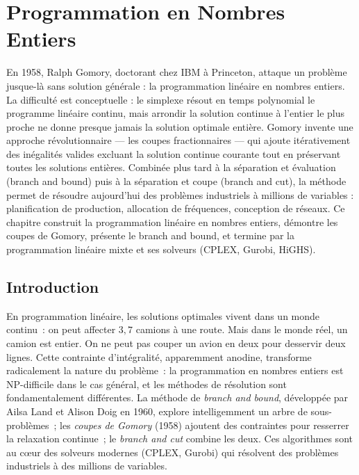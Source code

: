 \chapter{Programmation en Nombres Entiers}
\label{ch:nombres_entiers}

En 1958, Ralph Gomory, doctorant chez IBM à Princeton, attaque un problème jusque-là sans solution générale : la programmation linéaire en nombres entiers. La difficulté est conceptuelle : le simplexe résout en temps polynomial le programme linéaire continu, mais arrondir la solution continue à l'entier le plus proche ne donne presque jamais la solution optimale entière. Gomory invente une approche révolutionnaire --- les coupes fractionnaires --- qui ajoute itérativement des inégalités valides excluant la solution continue courante tout en préservant toutes les solutions entières. Combinée plus tard à la séparation et évaluation (branch and bound) puis à la séparation et coupe (branch and cut), la méthode permet de résoudre aujourd'hui des problèmes industriels à millions de variables : planification de production, allocation de fréquences, conception de réseaux. Ce chapitre construit la programmation linéaire en nombres entiers, démontre les coupes de Gomory, présente le branch and bound, et termine par la programmation linéaire mixte et ses solveurs (CPLEX, Gurobi, HiGHS).

\section{Introduction}

En programmation lin\'eaire, les solutions optimales vivent dans un monde continu~: on peut affecter $3{,}7$ camions \`a une route. Mais dans le monde r\'eel, un camion est entier. On ne peut pas couper un avion en deux pour desservir deux lignes. Cette contrainte d'int\'egralit\'e, apparemment anodine, transforme radicalement la nature du probl\`eme~: la programmation en nombres entiers est NP-difficile dans le cas g\'en\'eral, et les m\'ethodes de r\'esolution sont fondamentalement diff\'erentes. La m\'ethode de \emph{branch and bound}, d\'evelopp\'ee par Ailsa Land et Alison Doig en 1960, explore intelligemment un arbre de sous-probl\`emes~; les \emph{coupes de Gomory} (1958) ajoutent des contraintes pour resserrer la relaxation continue~; le \emph{branch and cut} combine les deux. Ces algorithmes sont au c\oe ur des solveurs modernes (CPLEX, Gurobi) qui r\'esolvent des probl\`emes industriels \`a des millions de variables.

